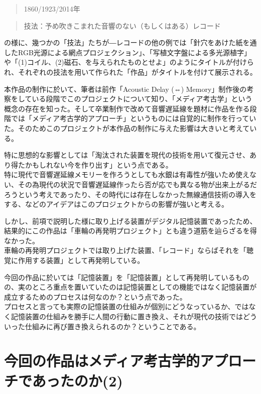 \documentclass[a4paper,report]{jsbook}
\begin{document}
\begin{quote}
1860/1923/2014年
\end{quote}

\begin{quote}
技法：予め吹きこまれた音響のない（もしくはある）レコード
\end{quote}

の様に、幾つかの「技法」たちが―レコードの他の例では「針穴をあけた紙を通したRGB光源による網点プロジェクション」、「写植文字盤による多光源植字」や「(1)コイル、(2)磁石、を与えられたものとせよ」のようにタイトルが付けられ、それぞれの技法を用いて作られた「作品」がタイトルを付けて展示される。

本作品の制作に於いて、筆者は前作「Acoustic Delay (⇔)
Memory」制作後の考察をしている段階でこのプロジェクトについて知り、「メディア考古学」という概念の存在を知った。そして卒業制作で改めて音響遅延線を題材に作品を作る段階では「メディア考古学的アプローチ」というものには自覚的に制作を行っていた。そのためこのプロジェクトが本作品の制作に与えた影響は大きいと考えている。

特に思想的な影響としては「淘汰された装置を現代の技術を用いて復元させ、あり得たかもしれない今を作り出す」という点である。\\
特に現代で音響遅延線メモリーを作ろうとしても水銀は有毒性が強いため使えない、その為現代の状況で音響遅延線作ったら否が応でも異なる物が出来上がるだろうという考えであったり、その時代には存在しなかった無線通信技術の導入をする、などのアイデアはこのプロジェクトからの影響が強いと考える。

しかし、前項で説明した様に取り上げる装置がデジタル記憶装置であったため、結果的にこの作品は「車輪の再発明プロジェクト」とも違う道筋を辿らざるを得なかった。\\
車輪の再発明プロジェクトでは取り上げた装置、「レコード」ならばそれを「聴覚に作用する装置」として再発明している。

今回の作品に於いては「記憶装置」を「記憶装置」として再発明しているものの、実のところ重点を置いていたのは記憶装置としての機能ではなく記憶装置が成立するためのプロセスは何なのか？という点であった。\\
プロセスと言っても実際の記憶装置の仕組みが個別にどうなっているか、ではなく記憶装置の仕組みを勝手に人間の行動に置き換え、それが現代の技術ではどういった仕組みに再び置き換えられるのか？ということである。

\section{今回の作品はメディア考古学的アプローチであったのか(2)}\label{ux4ecaux56deux306eux4f5cux54c1ux306fux30e1ux30c7ux30a3ux30a2ux8003ux53e4ux5b66ux7684ux30a2ux30d7ux30edux30fcux30c1ux3067ux3042ux3063ux305fux306eux304b2}
\end{document}
